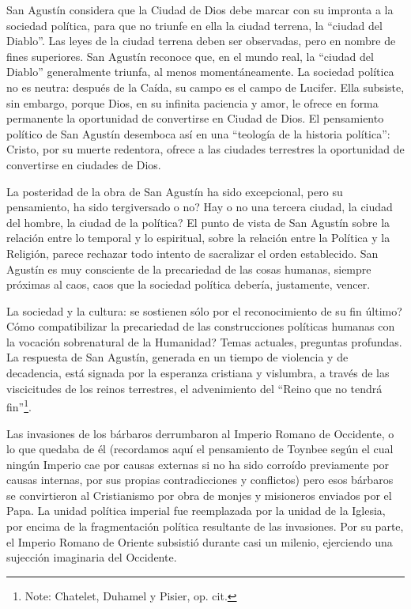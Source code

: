 \documentclass[
]{book}
\begin{document}
San Agustín considera que la Ciudad de Dios debe marcar con su impronta a la sociedad política, para que no triunfe en ella la ciudad terrena, la ``ciudad del Diablo''. Las leyes de la ciudad terrena deben ser observadas, pero en nombre de fines superiores. San Agustín reconoce que, en el mundo real, la ``ciudad del Diablo'' generalmente triunfa, al menos momentáneamente. La sociedad política no es neutra: después de la Caída, su campo es el campo de Lucifer. Ella subsiste, sin embargo, porque Dios, en su infinita paciencia y amor, le ofrece en forma permanente la oportunidad de convertirse en Ciudad de Dios. El pensamiento político de San Agustín desemboca así en una ``teología de la historia política'': Cristo, por su muerte redentora, ofrece a las ciudades terrestres la oportunidad de convertirse en ciudades de Dios.

La posteridad de la obra de San Agustín ha sido excepcional, pero su pensamiento, ha sido tergiversado o no? Hay o no una tercera ciudad, la ciudad del hombre, la ciudad de la política? El punto de vista de San Agustín sobre la relación entre lo temporal y lo espiritual, sobre la relación entre la Política y la Religión, parece rechazar todo intento de sacralizar el orden establecido. San Agustín es muy consciente de la precariedad de las cosas humanas, siempre próximas al caos, caos que la sociedad política debería, justamente, vencer.

La sociedad y la cultura: se sostienen sólo por el reconocimiento de su fin último? Cómo compatibilizar la precariedad de las construcciones políticas humanas con la vocación sobrenatural de la Humanidad? Temas actuales, preguntas profundas. La respuesta de San Agustín, generada en un tiempo de violencia y de decadencia, está signada por la esperanza cristiana y vislumbra, a través de las viscicitudes de los reinos terrestres, el advenimiento del ``Reino que no tendrá fin''\footnote{Note: Chatelet, Duhamel y Pisier, op. cit.}.

Las invasiones de los bárbaros derrumbaron al Imperio Romano de Occidente, o lo que quedaba de él (recordamos aquí el pensamiento de Toynbee según el cual ningún Imperio cae por causas externas si no ha sido corroído previamente por causas internas, por sus propias contradicciones y conflictos) pero esos bárbaros se convirtieron al Cristianismo por obra de monjes y misioneros enviados por el Papa. La unidad política imperial fue reemplazada por la unidad de la Iglesia, por encima de la fragmentación política resultante de las invasiones. Por su parte, el Imperio Romano de Oriente subsistió durante casi un milenio, ejerciendo una sujección imaginaria del Occidente.
\end{document}
